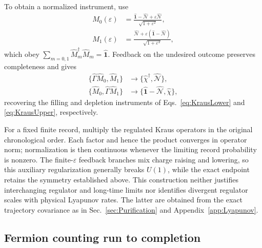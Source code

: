 \documentclass[aps,prb,10pt,twocolumn,superscriptaddress,longbibliography,floatfix]{revtex4-2}
\newcommand{\mc}[1]{\mathcal{#1}}
\begin{document}
{To obtain a normalized instrument, use
\begin{align}
 \hat M_0(\varepsilon)&=\frac{\hat{\mathbf{1}}-\hat{\mc N}+\varepsilon\hat{\mc N}}{\sqrt{1+\varepsilon^2}},\nonumber\\
 \hat M_1(\varepsilon)&=\frac{\hat{\mc N}+\varepsilon(\hat{\mathbf{1}}-\hat{\mc N})}{\sqrt{1+\varepsilon^2}},
 \label{eq:GainLossRegulatedMeasurement}
\end{align}
which obey $\sum_{m=0,1}\hat M_m^\dagger\hat M_m=\hat{\mathbf{1}}$. Feedback on the undesired outcome preserves completeness and gives
\begin{align}
 \{\hat\Gamma\hat M_0,\hat M_1\}
 &\longrightarrow\{\hat\chi^\dagger,\hat{\mc N}\},\nonumber\\
 \{\hat M_0,\hat\Gamma\hat M_1\}
 &\longrightarrow\{\hat{\mathbf{1}}-\hat{\mc N},\hat\chi\},
 \label{eq:GainLossRegulatedFeedback}
\end{align}
recovering the filling and depletion instruments of Eqs.~\eqref{eq:KrausLower} and \eqref{eq:KrausUpper}, respectively.

For a fixed finite record, multiply the regulated Kraus operators in the original chronological order. Each factor and hence the product converges in operator norm; normalization is then continuous whenever the limiting record probability is nonzero. The finite-$\varepsilon$ feedback branches mix charge raising and lowering, so this auxiliary regularization generally breaks $U(1)$, while the exact endpoint retains the symmetry established above. This construction neither justifies interchanging regulator and long-time limits nor identifies divergent regulator scales with physical Lyapunov rates. The latter are obtained from the exact trajectory covariance as in Sec.~\ref{sec:Purification} and Appendix~\ref{app:Lyapunov}.
}

\subsection{Fermion counting run to completion}
\end{document}
